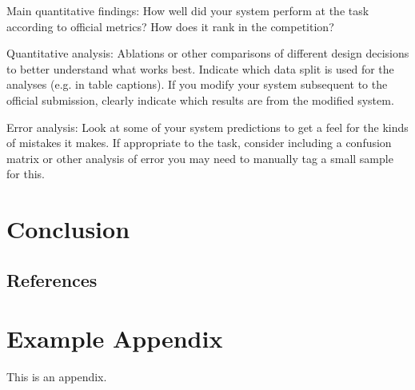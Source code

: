 \documentclass[11pt]{article}
\begin{document}



Main quantitative findings: How well did your system perform at the task
according to official metrics? How does it rank in the competition?

Quantitative analysis: Ablations or other comparisons of different design
decisions to better understand what works best. Indicate which data split is
used for the analyses (e.g. in table captions). If you modify your system
subsequent to the official submission, clearly indicate which results are
from the modified system.

Error analysis: Look at some of your system predictions to get a feel for
the kinds of mistakes it makes. If appropriate to the task, consider
including a confusion matrix or other analysis of error you may need to
manually tag a small sample for this.

\section{Conclusion}


\subsection{References}


\appendix

\section{Example Appendix}

\label{sec:appendix}

This is an appendix.
\end{document}
